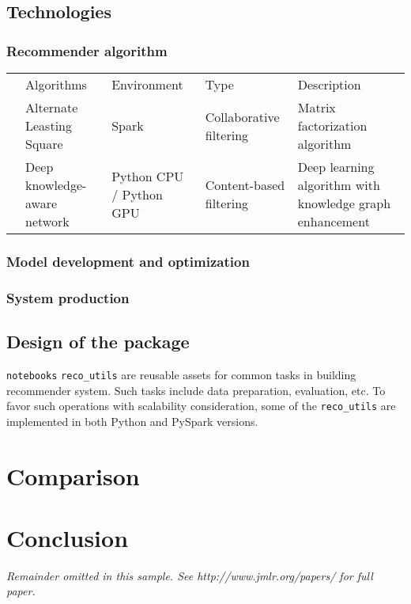 \documentclass[twoside,11pt]{article}
\begin{document}
\subsection{Technologies}
\subsubsection{Recommender algorithm}
\begin{table}[]
\begin{tabular}{lllll}
 & Algorithms  & Environment & Type & Description \\
 & Alternate Leasting Square & Spark & Collaborative filtering & Matrix factorization algorithm \\
 & Deep knowledge-aware network & Python CPU / Python GPU & Content-based filtering & Deep learning algorithm with knowledge graph enhancement  \\
\end{tabular}
\end{table}

\subsubsection{Model development and optimization}
\subsubsection{System production}

\subsection{Design of the package}
\verb|notebooks|
\verb|reco_utils| are reusable assets for common tasks in building recommender system. Such tasks include data preparation, evaluation, etc. To favor such operations with scalability consideration, some of the \verb|reco_utils| are implemented in both Python and PySpark versions.

\section{Comparison}

\section{Conclusion}

{\noindent \em Remainder omitted in this sample. See http://www.jmlr.org/papers/ for full paper.}
\end{document}
